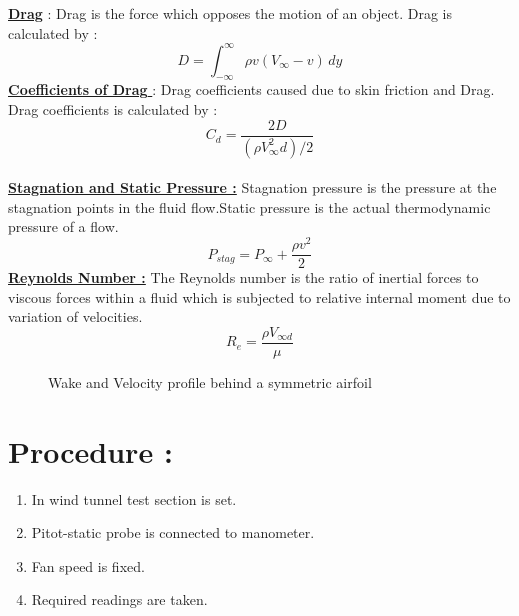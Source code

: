 \documentclass[12pt,a4paper]{article}
\begin{document}
\underline{\textbf{Drag}} : Drag is the force which opposes the motion of an object.
Drag is calculated by : \\
$$D = \int_{-\infty}^{\infty} \rho v (V_{\infty}-v)\,dy $$
\underline{\textbf{Coefficients of Drag }} :
Drag coefficients caused due to skin friction and Drag. Drag coefficients is calculated by :
$$ C_d = \frac{2D}{(\rho V_{\infty}^2 d)/2} $$ \\
\underline{\textbf{Stagnation and Static Pressure :}}
Stagnation pressure is the pressure at the stagnation points in the fluid flow.Static pressure is the actual thermodynamic pressure of a flow.
$$  P_{stag} = P_{\infty} + \frac{\rho v^2}{2} $$
\underline{\textbf{Reynolds Number :}}
The Reynolds number is the ratio of inertial forces to viscous forces within a fluid which is subjected to relative internal moment due to variation of velocities.
$$  R_e = \frac{\rho V_{\infty d}}{\mu} $$
\begin{figure}[!ht]
	\begin{center}
	\end{center}
	\caption{Wake and Velocity profile behind a symmetric airfoil}
\end{figure}





\section{Procedure :}
\begin{enumerate}
    \item In wind tunnel test section is set.
    \item Pitot-static probe is connected to manometer.
    \item Fan speed is fixed.
    \item Required readings are taken.
\end{enumerate}
\end{document}
